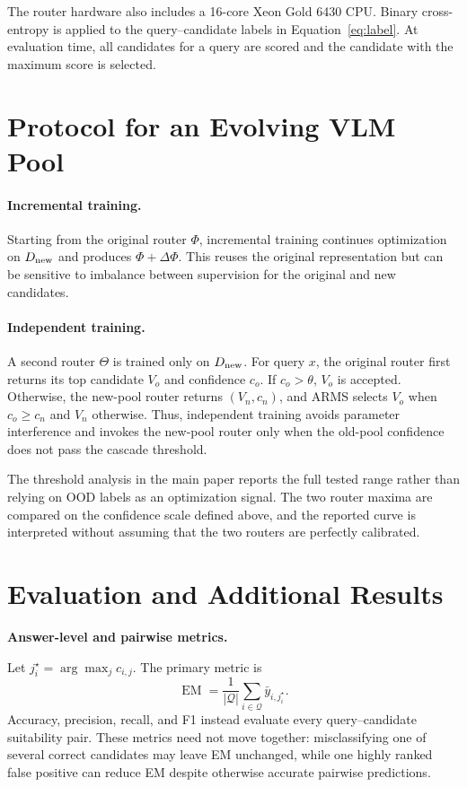 \documentclass[letterpaper]{article}
\begin{document}
The router hardware also includes a 16-core Xeon Gold 6430 CPU. Binary
cross-entropy is applied to the query--candidate labels in
Equation~\ref{eq:label}. At evaluation time, all candidates for a query are
scored and the candidate with the maximum score is selected.

\section{Protocol for an Evolving VLM Pool}

\paragraph{Incremental training.}
Starting from the original router $\Phi$, incremental training continues
optimization on $D_{\rm new}$ and produces $\Phi+\Delta\Phi$. This reuses the
original representation but can be sensitive to imbalance between supervision
for the original and new candidates.

\paragraph{Independent training.}
A second router $\Theta$ is trained only on $D_{\rm new}$. For query $x$, the
original router first returns its top candidate $V_o$ and confidence $c_o$. If
$c_o>\theta$, $V_o$ is accepted. Otherwise, the new-pool router returns
$(V_n,c_n)$, and ARMS selects $V_o$ when $c_o\geq c_n$ and $V_n$ otherwise.
Thus, independent training avoids parameter interference and invokes the
new-pool router only when the old-pool confidence does not pass the cascade
threshold.

The threshold analysis in the main paper reports the full tested range rather
than relying on OOD labels as an optimization signal. The two router maxima are
compared on the confidence scale defined above, and the reported curve is
interpreted without assuming that the two routers are perfectly calibrated.

\section{Evaluation and Additional Results}

\noindent\textbf{Answer-level and pairwise metrics.}\par
\noindent
Let $j_i^\star=\arg\max_j c_{i,j}$. The primary metric is
\begin{equation}
\operatorname{EM}=\frac{1}{|\mathcal{Q}|}
\sum_{i\in\mathcal{Q}}\bar y_{i,j_i^\star}.
\end{equation}
Accuracy, precision, recall, and F1 instead evaluate every
query--candidate suitability pair. These metrics need not move together:
misclassifying one of several correct candidates may leave EM unchanged, while
one highly ranked false positive can reduce EM despite otherwise accurate
pairwise predictions.
\end{document}
